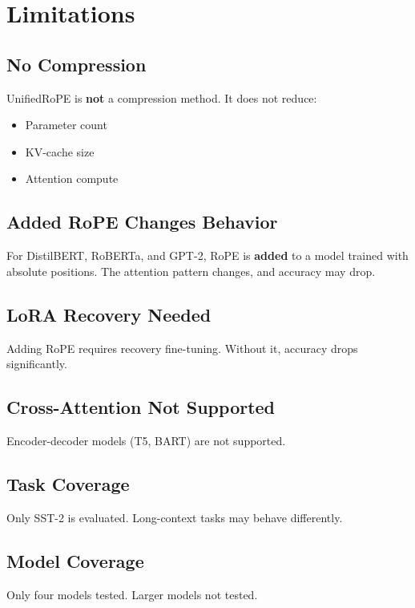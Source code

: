 
\section{Limitations}

\subsection{No Compression}

UnifiedRoPE is \textbf{not} a compression method. It does not reduce:
\begin{itemize}
\item Parameter count
\item KV-cache size
\item Attention compute

\end{itemize}
\subsection{Added RoPE Changes Behavior}

For DistilBERT, RoBERTa, and GPT-2, RoPE is \textbf{added} to a model trained 
with absolute positions. The attention pattern changes, and accuracy may 
drop.

\subsection{LoRA Recovery Needed}

Adding RoPE requires recovery fine-tuning. Without it, accuracy drops 
significantly.

\subsection{Cross-Attention Not Supported}

Encoder-decoder models (T5, BART) are not supported.

\subsection{Task Coverage}

Only SST-2 is evaluated. Long-context tasks may behave differently.

\subsection{Model Coverage}

Only four models tested. Larger models not tested.

